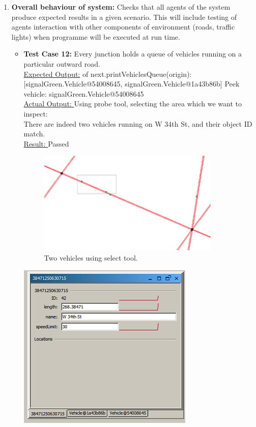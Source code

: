\documentclass[11pt]{article}
\begin{document}
\begin{enumerate}
\item \textbf{Overall behaviour of system: }%
Checks that all agents of the system produce expected results in a given scenario. This will include testing of agents interaction with other components of environment (roads, traffic lights) when programme will be executed at run time.\hfill \\
\begin{itemize}%
\item \textbf{Test Case 12:} Every junction holds a queue of vehicles running on a particular outward road.\hfill \\
\underline{Expected Output:} of next.printVehiclesQueue(origin):[signalGreen.Vehicle@54008645, signalGreen.Vehicle@1a43b86b] Peek vehicle: signalGreen.Vehicle@54008645\hfill \\
\underline{Actual Output: }Using probe tool, selecting the area which we want to inspect:\hfill \\
There are indeed two vehicles running on W 34th St, and their object ID match.\hfill \\
\underline{Result: }Passed\hfill \\
\begin{figure}[h]
\begin{center}
\includegraphics[scale=0.7]{RoadNetwork}\hfill \\
Two vehicles using select tool.
\end{center}
\end{figure}
\begin{table}[H]
\begin{center}
\includegraphics{Sim}\hfill \\

\end{center}
\end{table}
\end{itemize}
\end{enumerate}
\end{document}
